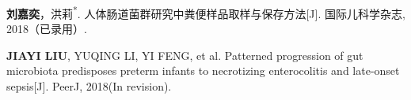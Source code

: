 
\begin{publications}{99}
    \item \textsc{\textbf{刘嘉奕}，洪莉\textsuperscript{*}}. {人体肠道菌群研究中粪便样品取样与保存方法}[J]. 国际儿科学杂志, 2018（已录用）.
    \item \textsc{\textbf{JIAYI LIU}, YUQING LI, YI FENG}, et al. {Patterned progression of gut microbiota predisposes preterm infants to necrotizing enterocolitis and late-onset sepsis}[J]. PeerJ, 2018(In revision).
\end{publications}
